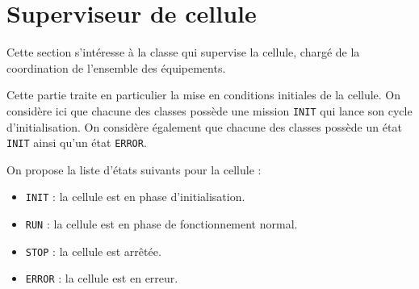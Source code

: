 \section{Superviseur de cellule}
Cette section s'intéresse à la classe qui supervise la cellule, chargé de la coordination de l'ensemble des équipements.

Cette partie traite en particulier la mise en conditions initiales de la cellule. 
On considère ici que chacune des classes possède une mission \lstinline|INIT| qui lance son cycle d'initialisation. On considère également que chacune des classes possède un état \lstinline|INIT| ainsi qu'un état \lstinline|ERROR|.

On propose la liste d'états suivants pour la cellule : 
\begin{itemize}
    \item \lstinline|INIT| : la cellule est en phase d'initialisation.
    \item \lstinline|RUN| : la cellule est en phase de fonctionnement normal.
    \item \lstinline|STOP| : la cellule est arrêtée.
    \item \lstinline|ERROR| : la cellule est en erreur.
\end{itemize}




